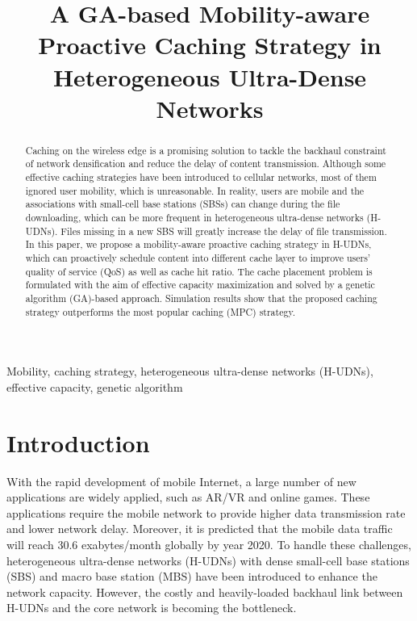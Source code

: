 \documentclass[conference]{IEEEtran}
\begin{document}
\title{A GA-based Mobility-aware Proactive Caching Strategy in Heterogeneous Ultra-Dense Networks}

\author{


}

\maketitle

\begin{abstract}
Caching on the wireless edge is a promising solution to tackle the backhaul constraint of network densification and reduce the delay of content transmission. Although some effective caching strategies have been introduced to cellular networks, most of them ignored user mobility, which is unreasonable. In reality, users are mobile and the associations with small-cell base stations (SBSs) can change during the file downloading, which can be more frequent in heterogeneous ultra-dense networks (H-UDNs). Files missing in a new SBS will greatly increase the delay of file transmission. In this paper, we propose a mobility-aware proactive caching strategy in H-UDNs, which can proactively schedule content into different cache layer to improve users’ quality of service (QoS) as well as cache hit ratio. The cache placement problem is formulated with the aim of effective capacity maximization and solved by a genetic algorithm (GA)-based approach. Simulation results show that the proposed caching strategy outperforms the most popular caching (MPC) strategy.
\end{abstract}

\begin{IEEEkeywords}
 Mobility, caching strategy, heterogeneous ultra-dense networks (H-UDNs), effective capacity, genetic algorithm
\end{IEEEkeywords}

\section{Introduction}
With the rapid development of mobile Internet, a large number of new applications are widely applied, such as AR/VR and online games. These applications require the mobile network to provide higher data transmission rate and lower network delay. Moreover, it is predicted that the mobile data traffic will reach 30.6 exabytes/month globally by year 2020\cite{cisco}. To handle these challenges, heterogeneous ultra-dense networks (H-UDNs) with dense small-cell base stations (SBS) and macro base station (MBS) have been introduced to enhance the network capacity. However, the costly and heavily-loaded backhaul link between H-UDNs and the core network is becoming the bottleneck\cite{6963798}.
\end{document}
